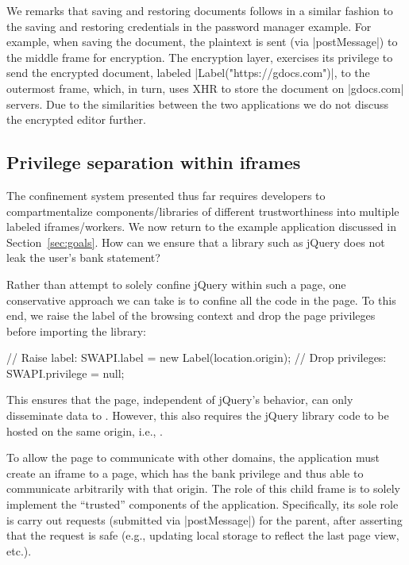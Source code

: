 We remarks that saving and restoring documents follows in a similar
fashion to the saving and restoring credentials in the password
manager example.  For example, when saving the document, the plaintext
is sent (via \js|postMessage|) to the middle frame for encryption.
The encryption layer, exercises its privilege  to
send the encrypted document, labeled \js|Label("https://gdocs.com")|,
to the outermost frame, which, in turn, uses XHR to store the document
on \js|gdocs.com| servers. Due to the similarities between the two
applications we do not discuss the encrypted editor further.


\subsection{Privilege separation within iframes}
\label{sec:system:script}

The confinement system presented thus far requires developers to
compartmentalize components/libraries of different trustworthiness into
multiple labeled iframes/workers.
%
%
We now return to the  example application discussed in
Section~\ref{sec:goals}. How can we ensure that a library such as
jQuery does not leak the user's bank statement?

Rather than attempt to solely confine jQuery within such a page, one
conservative approach we can take is to confine all the code in the
page.
%
To this end, we raise the label of the browsing context and drop the
page privileges before importing the library:
\begin{jscode}
// Raise label:
SWAPI.label = new Label(location.origin);
// Drop privileges:
SWAPI.privilege = null;
\end{jscode}
%
This ensures that the page, independent of jQuery's behavior, can only
disseminate data to .
%
However, this also requires the jQuery library code to be hosted on
the same origin, i.e., .
%

To allow the page to communicate with other domains, the application
must create an iframe to a  page, which has the bank
privilege and thus able to communicate arbitrarily with that origin.
%
The role of this child frame is to solely implement the ``trusted''
components of the application.
%
Specifically, its sole role is carry out requests (submitted via
\js|postMessage|) for the parent, after asserting that the request is
safe (e.g., updating local storage to reflect the last page view,
etc.).


